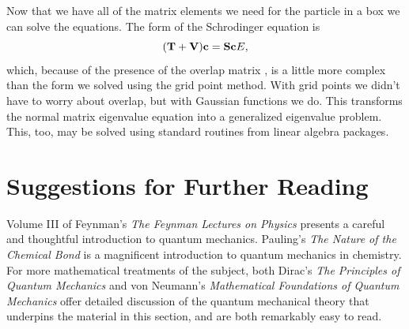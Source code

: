 
Now that we have all of the matrix elements we need for the particle 
in a box we can solve the equations. The form of the Schrodinger
equation is
\begin{equation}
 (\mathbf{T}+\mathbf{V})\mathbf{c} = \mathbf{S}\mathbf{c}E,
\end{equation}
which, because of the presence of the overlap matrix , is a 
little more complex than the form we solved using the grid point method. 
With grid points we didn't have to worry about overlap, but with Gaussian
functions we do. This transforms the normal matrix eigenvalue equation 
into a generalized eigenvalue problem. This, too, may be solved using 
standard routines from linear algebra packages.


\section{Suggestions for Further Reading}
Volume III of Feynman's \emph{The Feynman Lectures on Physics}
\cite{Feynman65} presents a careful and thoughtful introduction to
quantum mechanics. Pauling's \emph{The Nature of the Chemical Bond}
\cite{Pauling60} is a magnificent introduction to quantum mechanics in
chemistry. For more mathematical treatments of the subject, both
Dirac's \emph{The Principles of Quantum Mechanics} \cite{Dirac57} and
von Neumann's \emph{Mathematical Foundations of Quantum Mechanics}
\cite{VonNeumann55} offer detailed discussion of the quantum
mechanical theory that underpins the material in this
section, and are both remarkably easy to read. 
